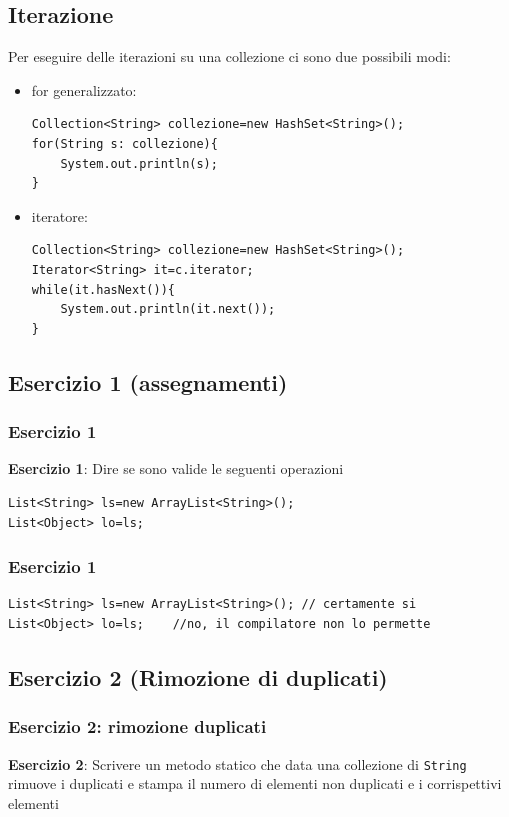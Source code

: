 \documentclass{beamer}
\begin{document}
\subsection{Iterazione}
\begin{frame}[fragile]
Per eseguire delle iterazioni su una collezione ci sono due possibili modi:
\begin{itemize}
\item for generalizzato:
\begin{lstlisting}
Collection<String> collezione=new HashSet<String>();
for(String s: collezione){
    System.out.println(s);
}
\end{lstlisting}
\item iteratore:
\begin{lstlisting}
Collection<String> collezione=new HashSet<String>();
Iterator<String> it=c.iterator;
while(it.hasNext()){
    System.out.println(it.next());
}
\end{lstlisting}

\end{itemize}

\end{frame}





\subsection{Esercizio 1 (assegnamenti)}
\begin{frame}[fragile]
\frametitle{Esercizio 1}
\begin{framed}
\textbf{Esercizio 1}: Dire se sono valide le seguenti operazioni
\begin{lstlisting}
List<String> ls=new ArrayList<String>();
List<Object> lo=ls;
\end{lstlisting}
\end{framed}
\end{frame}

\begin{frame}[fragile]
\frametitle{Esercizio 1}
\begin{lstlisting}
List<String> ls=new ArrayList<String>(); // certamente si
List<Object> lo=ls;    //no, il compilatore non lo permette
\end{lstlisting}
\end{frame}



\subsection{Esercizio 2 (Rimozione di duplicati)}
\begin{frame}[fragile]
\frametitle{Esercizio 2: rimozione duplicati}
\begin{framed}
\textbf{Esercizio 2}: Scrivere un metodo statico che data una collezione di \texttt{String} rimuove i duplicati e stampa il numero di elementi non duplicati e i corrispettivi elementi
\end{framed}
\end{frame}
\end{document}
